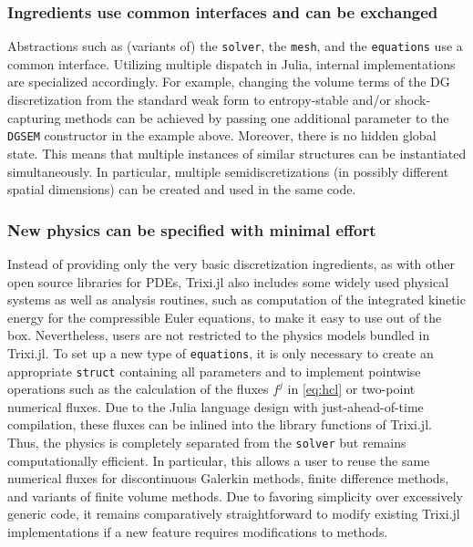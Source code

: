 \documentclass[hidelinks]{juliacon} %
\newcommand{\trixi}{Trixi.jl\xspace}
\begin{document}
\subsubsection{Ingredients use common interfaces and can be exchanged}

Abstractions such as (variants of) the \lstinline{solver}, the \lstinline{mesh},
and the \lstinline{equations} use a common interface. Utilizing multiple
dispatch in Julia, internal implementations are specialized accordingly. For
example, changing the volume terms of the DG discretization from the standard
weak form to entropy-stable and/or shock-capturing methods can be achieved by
passing one additional parameter to the \lstinline{DGSEM} constructor in the
example above. Moreover, there is no hidden global state. This means that multiple instances
of similar structures can be instantiated simultaneously. In particular, multiple
semidiscretizations (in possibly different spatial dimensions) can be created
and used in the same code.

\subsubsection{New physics can be specified with minimal effort}

Instead of providing only the very basic discretization ingredients, as with
other open source libraries for PDEs, \trixi also includes some widely used
physical systems as well as analysis routines, such as computation of the integrated kinetic energy
for the compressible Euler equations,
to make it easy to use out of the box. Nevertheless, users are not restricted
to the physics models bundled in \trixi. To set up a new type of \lstinline{equations},
it is only necessary to create an appropriate \lstinline{struct} containing all
parameters and to implement pointwise operations such as the calculation of
the fluxes $f^j$ in \eqref{eq:hcl} or two-point numerical fluxes. Due to the Julia language
design with just-ahead-of-time compilation, these fluxes can be inlined into the
library functions of \trixi. Thus, the physics is completely separated from
the \lstinline{solver} but remains computationally efficient. In particular, this allows
a user to reuse the same numerical fluxes for discontinuous Galerkin methods, finite
difference methods, and variants of finite volume methods.
Due to favoring
simplicity over excessively generic code, it remains comparatively straightforward to modify
existing \trixi implementations if a new feature requires modifications to methods.
\end{document}

